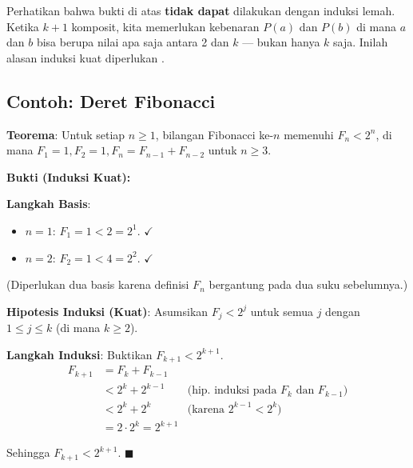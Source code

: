 \begin{catatan}
Perhatikan bahwa bukti di atas \textbf{tidak dapat} dilakukan dengan induksi lemah. Ketika $k+1$ komposit, kita memerlukan kebenaran $P(a)$ dan $P(b)$ di mana $a$ dan $b$ bisa berupa nilai apa saja antara 2 dan $k$ --- bukan hanya $k$ saja. Inilah alasan induksi kuat diperlukan \cite{wiki_strong_induction}.
\end{catatan}

\subsection{Contoh: Deret Fibonacci}

\begin{contoh}
\textbf{Teorema}: Untuk setiap $n \geq 1$, bilangan Fibonacci ke-$n$ memenuhi $F_n < 2^n$, di mana $F_1 = 1, F_2 = 1, F_n = F_{n-1} + F_{n-2}$ untuk $n \geq 3$.

\textbf{Bukti (Induksi Kuat):}

\textbf{Langkah Basis}:
\begin{itemize}
    \item $n = 1$: $F_1 = 1 < 2 = 2^1$. $\checkmark$
    \item $n = 2$: $F_2 = 1 < 4 = 2^2$. $\checkmark$
\end{itemize}
(Diperlukan dua basis karena definisi $F_n$ bergantung pada dua suku sebelumnya.)

\textbf{Hipotesis Induksi (Kuat)}: Asumsikan $F_j < 2^j$ untuk semua $j$ dengan $1 \leq j \leq k$ (di mana $k \geq 2$).

\textbf{Langkah Induksi}: Buktikan $F_{k+1} < 2^{k+1}$.
\begin{align*}
F_{k+1} &= F_k + F_{k-1} \\
         &< 2^k + 2^{k-1} & \text{(hip. induksi pada $F_k$ dan $F_{k-1}$)} \\
         &< 2^k + 2^k & \text{(karena } 2^{k-1} < 2^k) \\
         &= 2 \cdot 2^k = 2^{k+1}
\end{align*}

Sehingga $F_{k+1} < 2^{k+1}$. $\blacksquare$
\end{contoh}
